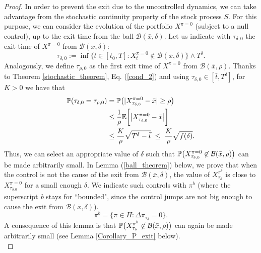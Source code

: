 \begin{proof}
In order to prevent the exit due to the uncontrolled dynamics, we can take advantage from the stochastic continuity property of the stock process $S$. 
For this purpose, we can 
consider the evolution of the portfolio $X^{\pi=0}$ (subject to a null control), up to the exit time from the ball $ \mathcal{B}(\bar x, \delta) $. 
Let us indicate with $\tau_{\delta,0}$ the exit time of $X^{\pi=0}$ from $ \mathcal{B}(\bar x, \delta) $:
\begin{equation}\label{tau_delta}
 \tau_{\delta,0} := \inf \{ t \in [t_0,T] : X^{\pi=0}_t \not \in \mathcal{B}(\bar x, \delta) \} \wedge T^{\delta}.
\end{equation}
Analogously, we define $\tau_{\rho,0}$ as the first exit time of $X^{\pi=0}$ from $ \mathcal{B}(\bar x, \rho) $.
Thanks to Theorem \ref{stochastic_theorem}, Eq. (\ref{cond_2}) and using $\tau_{\delta,0} \in [\bar t, T^{\delta}]$, for $K>0$ we have that 
\begin{align}\label{P_X_0}
 \mathbb{P}(\tau_{\delta,0} = \tau_{\rho,0} ) &= \mathbb{P} \bigl( |X^{\pi=0}_{\tau_{\delta,0}} - \bar x| \geq \rho \bigr) \\ \nonumber
   & \leq \frac{1}{\rho} \mathbb{E} \biggl[ \big| X^{\pi=0}_{\tau_{\delta,0}} - \bar x \big| \biggr] \\ \nonumber
   & \leq \frac{K}{\rho} \sqrt{T^{\delta} - \bar t} \; \leq \;  \frac{K}{\rho}\sqrt{f(\delta)} .
\end{align} 
Thus, we can select an appropriate value of $\delta$ such that $\mathbb{P} \bigl( X^{\pi=0}_{\tau_{\delta,0}} \not \in \mathcal{B}(\bar x, \rho) \bigr) $ 
can be made arbitrarily small.
In Lemma (\ref{ball_theorem}) below, we prove that when the 
control is not the cause of the exit from $\mathcal{B}(\bar x, \delta)$,  
the value of $X^{\pi^b}_{\tau_{\delta}}$ is close to $X^{\pi=0}_{\tau_{\delta,0}}$ for a small enough $\delta$. 
We indicate such controls with $\pi^b$ (where the superscript \emph{b} stays for ``bounded", since the control 
jumps are not big enough to cause the exit from $\mathcal{B}(\bar x, \delta)$). 
\begin{equation}\label{bounded_controls}
 \pi^b = \bigl\{ \pi \in \Pi : \Delta \pi_{\tau_{\delta}} = 0 \bigr\}. 
\end{equation}
A consequence of this lemma is that $\mathbb{P} \bigl( X^{\pi^b}_{\tau_{\delta}} \not \in \mathcal{B}(\bar x, \rho) \bigr)$ can again be made arbitrarily small (see Lemma 
\ref{Corollary_P_exit} below).\\


\end{proof}
